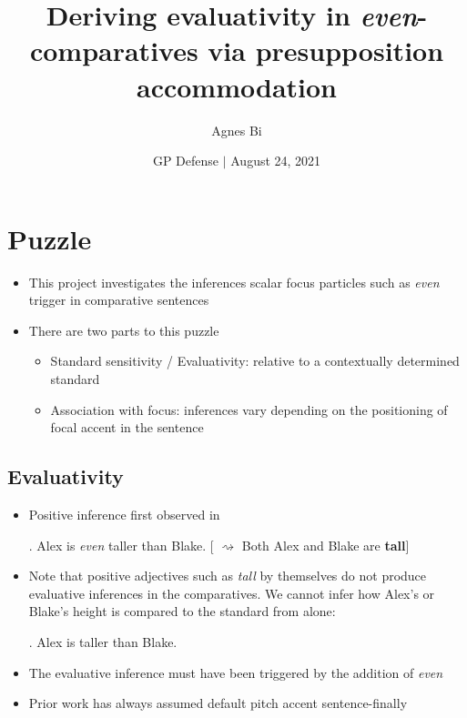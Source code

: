 \documentclass[11pt,letterpaper]{scrartcl}
\title{Deriving evaluativity in \textit{even}-comparatives via presupposition accommodation}
\author{Agnes Bi}
\date{GP Defense $|$ August 24, 2021}
\newcommand{\alignright}{\hspace*{\fill}}
\newcommand{\infer}{$\rightsquigarrow$ }
\begin{document}
\setlength{\Exlabelsep}{0.6em}  %
\setlength{\SubExleftmargin}{1.6em}  %

\setlength{\abovedisplayskip}{0pt}
\setlength{\belowdisplayskip}{0pt}
\setlength{\abovedisplayshortskip}{0pt}
\setlength{\belowdisplayshortskip}{0pt}

\maketitle

\section{Puzzle}

\begin{itemize}
    \item This project investigates the inferences scalar focus particles such as \textit{even} trigger in comparative sentences

    \item There are two parts to this puzzle
        \begin{itemize}
            \item Standard sensitivity / Evaluativity: relative to a contextually determined standard
            
            \item Association with focus: inferences vary depending on the positioning of focal accent in the sentence
        \end{itemize}
\end{itemize}


\subsection{Evaluativity} 

\begin{itemize}
    \item Positive inference first observed in \cite{greenberg_even_2015}
    
    \ex. Alex is \textit{even} taller than Blake. \alignright [ \infer Both Alex and Blake are \textbf{tall}] \label{Greenberg10}
    
    \item Note that positive adjectives such as \textit{tall} by themselves do not produce evaluative inferences in the comparatives. We cannot infer how Alex's or Blake's height is compared to the standard from \Next alone:

    \ex. Alex is taller than Blake.
    
    \item The evaluative inference must have been triggered by the addition of \textit{even}
    
    \item Prior work has always assumed default pitch accent sentence-finally

\end{itemize}
\end{document}
